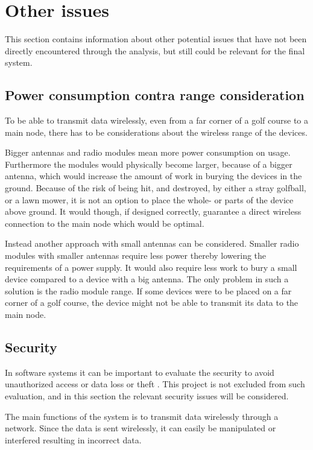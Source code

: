 \section{Other issues}
This section contains information about other potential issues that have not been directly encountered through the analysis, but still could be relevant for the final system.

\subsection{Power consumption contra range consideration} 
To be able to transmit data wirelessly, even from a far corner of a golf course to a main node, there has to be considerations about the wireless range of the devices. 

Bigger antennas and radio modules mean more power consumption on usage. Furthermore the modules would physically become larger, because of a bigger antenna, which would increase the amount of work in burying the devices in the ground. Because of the risk of being hit, and destroyed, by either a stray golfball, or a lawn mower, it is not an option to place the whole- or parts of the device above ground. It would though, if designed correctly, guarantee a direct wireless connection to the main node which would be optimal.

Instead another approach with small antennas can be considered. Smaller radio modules with smaller antennas require less power thereby lowering the requirements of a power supply. It would also require less work to bury a small device compared to a device with a big antenna. The only problem in such a solution is the radio module range. If some devices were to be placed on a far corner of a golf course, the device might not be able to transmit its data to the main node. 

\subsection{Security}
In software systems it can be important to evaluate the security to avoid unauthorized access or data loss or theft . This project is not excluded from such evaluation, and in this section the relevant security issues will be considered.

The main functions of the system is to transmit data wirelessly through a network. Since the data is sent wirelessly, it can easily be manipulated or interfered resulting in incorrect data.

